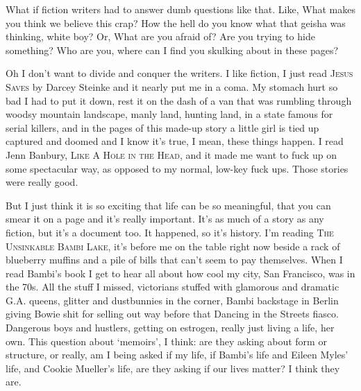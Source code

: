 \documentclass[
]{memoir}
\begin{document}
What if fiction writers had to answer dumb questions like that. Like,
What makes you think we believe this crap? How the hell do you know what
that geisha was thinking, white boy? Or, What are you afraid of? Are you
trying to hide something? Who are you, where can I find you skulking
about in these pages?

Oh I don't want to divide and conquer the writers. I like fiction, I
just read \textsc{Jesus Saves} by Darcey Steinke and it nearly put me in
a coma. My stomach hurt so bad I had to put it down, rest it on the dash
of a van that was rumbling through woodsy mountain landscape, manly
land, hunting land, in a state famous for serial killers, and in the
pages of this made-up story a little girl is tied up captured and doomed
and I know it's true, I mean, these things happen. I read Jenn Banbury,
\textsc{Like A Hole in the Head}, and it made me want to fuck up on some
spectacular way, as opposed to my normal, low-key fuck ups. Those
stories were really good.

But I just think it is so exciting that life can be so meaningful, that
you can smear it on a page and it's really important. It's as much of a
story as any fiction, but it's a document too. It happened, so it's
history. I'm reading \textsc{The Unsinkable Bambi Lake}, it's before me
on the table right now beside a rack of blueberry muffins and a pile of
bills that can't seem to pay themselves. When I read Bambi's book I get
to hear all about how cool my city, San Francisco, was in the 70s. All
the stuff I missed, victorians stuffed with glamorous and dramatic G.A.
queens, glitter and dustbunnies in the corner, Bambi backstage in Berlin
giving Bowie shit for selling out way before that Dancing in the Streets
fiasco. Dangerous boys and hustlers, getting on estrogen, really just
living a life, her own. This question about `memoirs', I think: are they
asking about form or structure, or really, am I being asked if my life,
if Bambi's life and Eileen Myles' life, and Cookie Mueller's life, are
they asking if our lives matter? I think they are.
\end{document}
